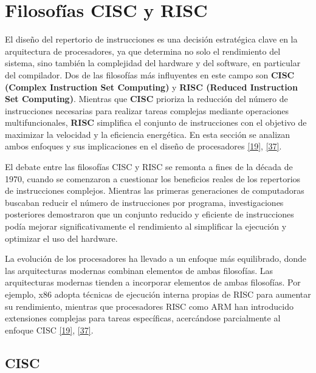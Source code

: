 \documentclass[12pt,oneside]{templates/unerthesis}
\begin{document}
\hypertarget{filosofuxedas-cisc-y-risc}{%
\section{Filosofías CISC y RISC}\label{filosofuxedas-cisc-y-risc}}

El diseño del repertorio de instrucciones es una decisión estratégica clave en la arquitectura de procesadores, ya que determina no solo el rendimiento del sistema, sino también la complejidad del hardware y del software, en particular del compilador. Dos de las filosofías más influyentes en este campo son \textbf{CISC (Complex Instruction Set Computing)} y \textbf{RISC (Reduced Instruction Set Computing)}. Mientras que \textbf{CISC} prioriza la reducción del número de instrucciones necesarias para realizar tareas complejas mediante operaciones multifuncionales, \textbf{RISC} simplifica el conjunto de instrucciones con el objetivo de maximizar la velocidad y la eficiencia energética. En esta sección se analizan ambos enfoques y sus implicaciones en el diseño de procesadores \protect\hyperlink{ref-hennessy2017computer}{{[}19{]}}, \protect\hyperlink{ref-patterson_computer_2014}{{[}37{]}}.

El debate entre las filosofías CISC y RISC se remonta a fines de la década de 1970, cuando se comenzaron a cuestionar los beneficios reales de los repertorios de instrucciones complejos. Mientras las primeras generaciones de computadoras buscaban reducir el número de instrucciones por programa, investigaciones posteriores demostraron que un conjunto reducido y eficiente de instrucciones podía mejorar significativamente el rendimiento al simplificar la ejecución y optimizar el uso del hardware.

La evolución de los procesadores ha llevado a un enfoque más equilibrado, donde las arquitecturas modernas combinan elementos de ambas filosofías. Las arquitecturas modernas tienden a incorporar elementos de ambas filosofías. Por ejemplo, x86 adopta técnicas de ejecución interna propias de RISC para aumentar su rendimiento, mientras que procesadores RISC como ARM han introducido extensiones complejas para tareas específicas, acercándose parcialmente al enfoque CISC \protect\hyperlink{ref-hennessy2017computer}{{[}19{]}}, \protect\hyperlink{ref-patterson_computer_2014}{{[}37{]}}.

\hypertarget{cisc}{%
\subsection{CISC}\label{cisc}}
\end{document}

